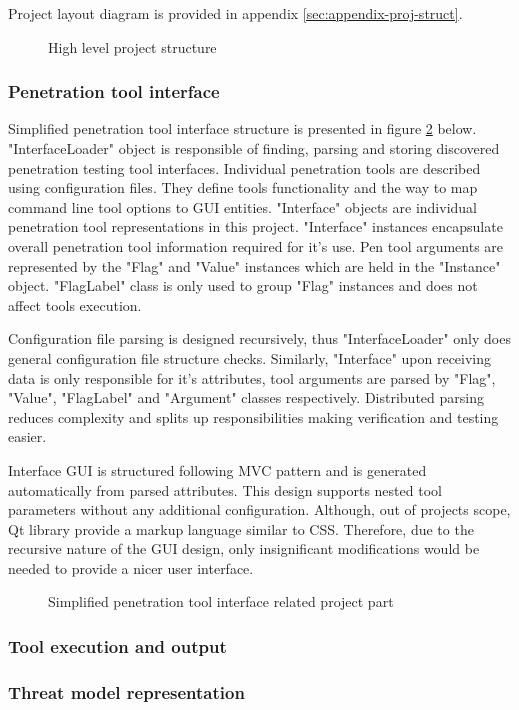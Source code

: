 Project layout diagram is provided in appendix \ref{sec:appendix-proj-struct}.

\begin{figure}[!htb]
	\caption{\label{fig:high-level-struct} High level project structure}
\end{figure}


\subsubsection{Penetration tool interface}
Simplified penetration tool interface structure is presented in figure \ref {fig:interface-struct} below. \newline
"InterfaceLoader" object is responsible of finding, parsing and storing discovered penetration testing tool interfaces. Individual penetration tools are described using configuration files. They define tools functionality and the way to map command line tool options to GUI entities. "Interface" objects are individual penetration tool representations in this project. "Interface" instances encapsulate overall penetration tool information required for it's use. Pen tool arguments are represented by the "Flag" and "Value" instances which are held in the "Instance" object. "FlagLabel" class is only used to group "Flag" instances and does not affect tools execution. 

Configuration file parsing is designed recursively, thus "InterfaceLoader" only does general configuration file structure checks. Similarly, "Interface" upon receiving data is only responsible for it's attributes, tool arguments are parsed by "Flag", "Value", "FlagLabel" and "Argument" classes respectively. Distributed parsing reduces complexity and splits up responsibilities making verification and testing easier.

Interface GUI is structured following MVC pattern and is generated automatically from parsed attributes. This design supports nested tool parameters without any additional configuration. Although, out of projects scope, Qt library provide a markup language similar to CSS. Therefore, due to the recursive nature of the GUI design, only insignificant modifications would be needed to provide a nicer user interface.

\begin{figure}[!htb]
	\caption{\label{fig:interface-struct} Simplified penetration tool interface related project part}
\end{figure}

\subsubsection{Tool execution and output}


\subsubsection{Threat model representation}
